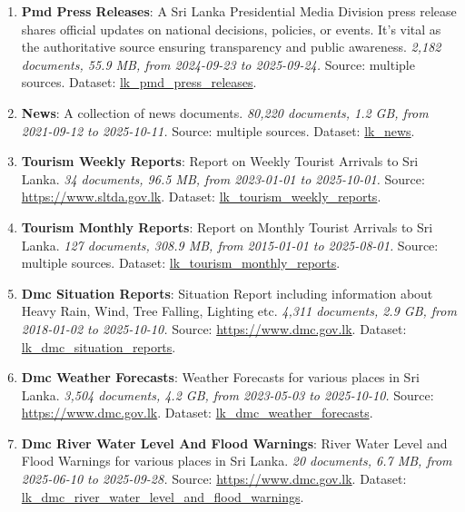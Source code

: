 \documentclass[10pt,a4paper]{article}%
\begin{document}
\begin{enumerate}
\item%
\textbf{Pmd Press Releases}: A Sri Lanka Presidential Media Division press release shares official updates on national decisions, policies, or events. It’s vital as the authoritative source ensuring transparency and public awareness.\textit{ 2,182 documents, 55.9 MB, from 2024{-}09{-}23 to 2025{-}09{-}24.} Source: multiple sources. Dataset: \href{https://github.com/nuuuwan/lk\_pmd/tree/data\_lk\_pmd\_press\_releases/data/lk\_pmd\_press\_releases}{lk\_pmd\_press\_releases}.%
\item%
\textbf{News}: A collection of news documents.\textit{ 80,220 documents, 1.2 GB, from 2021{-}09{-}12 to 2025{-}10{-}11.} Source: multiple sources. Dataset: \href{https://github.com/nuuuwan/lk\_news/tree/data/data/lk\_news}{lk\_news}.%
\item%
\textbf{Tourism Weekly Reports}: Report on Weekly Tourist Arrivals to Sri Lanka.\textit{ 34 documents, 96.5 MB, from 2023{-}01{-}01 to 2025{-}10{-}01.} Source: \href{https://www.sltda.gov.lk}{https://www.sltda.gov.lk}. Dataset: \href{https://github.com/nuuuwan/lk\_tourism/tree/data\_lk\_tourism\_weekly\_reports/data/lk\_tourism\_weekly\_reports}{lk\_tourism\_weekly\_reports}.%
\item%
\textbf{Tourism Monthly Reports}: Report on Monthly Tourist Arrivals to Sri Lanka.\textit{ 127 documents, 308.9 MB, from 2015{-}01{-}01 to 2025{-}08{-}01.} Source: multiple sources. Dataset: \href{https://github.com/nuuuwan/lk\_tourism/tree/data\_lk\_tourism\_monthly\_reports/data/lk\_tourism\_monthly\_reports}{lk\_tourism\_monthly\_reports}.%
\item%
\textbf{Dmc Situation Reports}: Situation Report including information about Heavy Rain, Wind, Tree Falling, Lighting etc.\textit{ 4,311 documents, 2.9 GB, from 2018{-}01{-}02 to 2025{-}10{-}10.} Source: \href{https://www.dmc.gov.lk}{https://www.dmc.gov.lk}. Dataset: \href{https://github.com/nuuuwan/lk\_dmc/tree/data\_lk\_dmc\_situation\_reports/data/lk\_dmc\_situation\_reports}{lk\_dmc\_situation\_reports}.%
\item%
\textbf{Dmc Weather Forecasts}: Weather Forecasts for various places in Sri Lanka.\textit{ 3,504 documents, 4.2 GB, from 2023{-}05{-}03 to 2025{-}10{-}10.} Source: \href{https://www.dmc.gov.lk}{https://www.dmc.gov.lk}. Dataset: \href{https://github.com/nuuuwan/lk\_dmc/tree/data\_lk\_dmc\_weather\_forecasts/data/lk\_dmc\_weather\_forecasts}{lk\_dmc\_weather\_forecasts}.%
\item%
\textbf{Dmc River Water Level And Flood Warnings}: River Water Level and Flood Warnings for various places in Sri Lanka.\textit{ 20 documents, 6.7 MB, from 2025{-}06{-}10 to 2025{-}09{-}28.} Source: \href{https://www.dmc.gov.lk}{https://www.dmc.gov.lk}. Dataset: \href{https://github.com/nuuuwan/lk\_dmc/tree/data\_lk\_dmc\_river\_water\_level\_and\_flood\_warnings/data/lk\_dmc\_river\_water\_level\_and\_flood\_warnings}{lk\_dmc\_river\_water\_level\_and\_flood\_warnings}.%

\end{enumerate}
\end{document}

